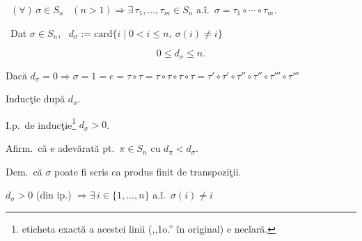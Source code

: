 \documentclass[12pt]{article}
\begin{document}
\bigskip
\noindent{} \ $(\forall)\,\sigma\in S_n$ \ $(n>1) \Rightarrow \exists\,\tau_1,\ldots,\tau_m\in S_n$ a.î.\ $\sigma=\tau_1\circ\cdots\circ\tau_m$.

\bigskip
\noindent{} \ Dat $\sigma\in S_n$, \ $d_\sigma := \text{card}\{i \mid 0<i\leq n,\ \sigma(i)\neq i\}$

\[
0\leq d_\sigma\leq n.
\]

\bigskip
\noindent Dacă $d_\sigma=0 \Rightarrow \sigma=1=e=\tau\circ\tau=\tau\circ\tau\circ\tau\circ\tau=\tau'\circ\tau'\circ\tau''\circ\tau''\circ\tau'''\circ\tau'''$

\bigskip
\noindent Inducţie după $d_\sigma$.

\noindent I.p.\ de inducţie\footnote{eticheta exactă a acestei linii (,,1o.'' în original) e neclară.} $d_\sigma>0$.

\bigskip
\noindent Afirm.\ că e adevărată pt.\ $\pi\in S_n$ cu $d_\pi<d_\sigma$.

\noindent Dem.\ că $\sigma$ poate fi scris ca produs finit de transpoziţii.

\noindent $d_\sigma>0$ (din ip.) $\Rightarrow \exists\,i\in\{1,\ldots,n\}$ a.î.\ $\sigma(i)\neq i$
\end{document}
